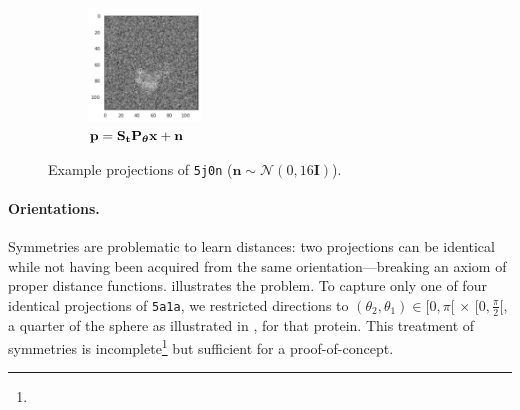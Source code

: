 \begin{figure}[ht!]
\begin{minipage}[b]{0.48\linewidth}
\begin{subfigure}[b]{0.49\linewidth}
        \end{subfigure}
        \hfill
        \begin{subfigure}[b]{0.49\linewidth}
            \centering
            \includegraphics[height=3cm]{figures/5j0n_noise16_translated}
            \caption{$\mathbf{p} = \mathbf{S}_{\mathbf{t}} \mathbf{P}_{{\boldsymbol{\theta}}} \mathbf{x} + \mathbf{n}$}
        \end{subfigure}
        \caption{%
            Example projections of \texttt{5j0n} ($\mathbf{n} \sim \mathcal{N}(0, 16\mathbf{I})$).
        }\label{fig:different-projections}
    \end{minipage}
\end{figure}

\paragraph{Orientations.}
Symmetries are problematic to learn distances: two projections can be identical while not having been acquired from the same orientation---breaking an axiom of proper distance functions.
 illustrates the problem.
To capture only one of four identical projections of \texttt{5a1a}, we restricted directions to $(\theta_2, \theta_1) \in [0, \pi[ \, \times \, [0, \frac{\pi}{2}[$, a quarter of the sphere as illustrated in , for that protein.
This treatment of symmetries is incomplete\footnote{} but sufficient for a proof-of-concept.

